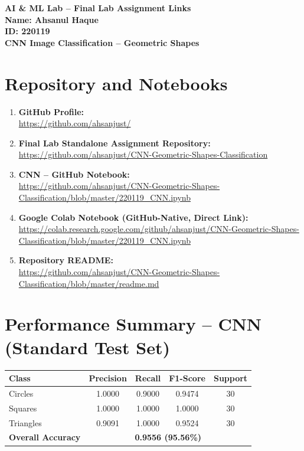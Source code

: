 \documentclass[11pt]{article}
\begin{document}
\begin{center}
    {\LARGE \textbf{AI \& ML Lab -- Final Lab Assignment Links}} \\[0.3cm]
    {\large \textbf{Name: Ahsanul Haque}} \\[0.1cm]
    {\large \textbf{ID: 220119}} \\[0.3cm]
    {\textbf{CNN Image Classification -- Geometric Shapes}} \\[0.4cm]
\end{center}

\section*{Repository and Notebooks}

\begin{enumerate}[leftmargin=*, itemsep=0.25cm]

    \item \textbf{GitHub Profile:} \\
    \url{https://github.com/ahsanjust/}

    \item \textbf{Final Lab Standalone Assignment Repository:} \\
    \url{https://github.com/ahsanjust/CNN-Geometric-Shapes-Classification}

    \item \textbf{CNN -- GitHub Notebook:} \\
    \url{https://github.com/ahsanjust/CNN-Geometric-Shapes-Classification/blob/master/220119_CNN.ipynb}

    \item \textbf{Google Colab Notebook (GitHub-Native, Direct Link):} \\
    \url{https://colab.research.google.com/github/ahsanjust/CNN-Geometric-Shapes-Classification/blob/master/220119_CNN.ipynb}

    \item \textbf{Repository README:} \\
    \url{https://github.com/ahsanjust/CNN-Geometric-Shapes-Classification/blob/master/readme.md}

\end{enumerate}

\section*{Performance Summary -- CNN (Standard Test Set)}

\begin{center}
\begin{tabular}{lcccc}
\toprule
\textbf{Class} & \textbf{Precision} & \textbf{Recall} & \textbf{F1-Score} & \textbf{Support} \\
\midrule
Circles    & 1.0000 & 0.9000 & 0.9474 & 30 \\
Squares    & 1.0000 & 1.0000 & 1.0000 & 30 \\
Triangles  & 0.9091 & 1.0000 & 0.9524 & 30 \\
\midrule
\textbf{Overall Accuracy} & \multicolumn{4}{c}{\textbf{0.9556 (95.56\%)}} \\
\bottomrule
\end{tabular}
\end{center}
\end{document}
